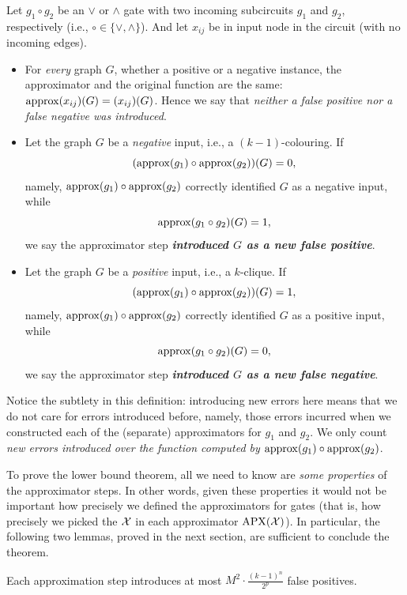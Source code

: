 \begin{definition}\label{def:new-errors}
Let $g_1\circ g_2$ be an $\lor$ or $\land$ gate with two incoming subcircuits $g_1$ and $g_2$, respectively (i.e., $\circ\in\{\lor,\land\}$). And let $x_{ij}$ be in input node in the circuit (with no incoming edges).
\begin{itemize}
\item 
For \emph{every} graph $G$, whether a positive or a  negative instance, the approximator and the original function are the same:  
${\rm approx}(x_{ij})(G)=(x_{ij})(G)$. Hence we say that \emph{neither a false positive nor a false negative was introduced}.   
 
\item 
Let the graph $G$ be a \emph{negative} input, i.e., a $(k-1)$-colouring. If 
$$({\rm approx}(g_1)\circ {\rm approx}(g_2))(G)=0,$$ namely, ${\rm approx}(g_1)\circ {\rm approx}(g_2)$ correctly identified $G$ as a negative input, 
while $${\rm approx}(g_1\circ g_2)(G)=1,$$ we say the approximator 
step \emph{\textbf{introduced $G$ as a new false positive}}. 

\item Let the graph $G$ be a \emph{positive} input, i.e., a $k$-clique. If 
$$({\rm approx}(g_1) \circ {\rm approx}(g_2))(G)=1,$$
 namely, ${\rm approx}(g_1)\circ {\rm approx}(g_2)$ correctly identified $G$ as a positive input, while 
$${\rm approx}(g_1\circ g_2)(G)=0,$$ we say the approximator step \textbf{\emph{introduced $G$ as a new false negative}}.
\end{itemize}
\end{definition}

Notice the  subtlety in this definition: introducing new errors here means that we do not care for errors introduced before, namely, those errors incurred  when we constructed each of the (separate) approximators for $g_1$ and $g_2$. We only count \emph{new errors introduced over the function computed by ${\rm approx}(g_1)\circ {\rm approx}(g_2)$}.







To prove the lower bound theorem, all we need to know are \emph{some properties} of the approximator steps. In other words, given these properties it would not be important how precisely we defined the approximators for gates (that is, how precisely we picked the $\mathcal{X}$ in each approximator $\mathrm{APX}(\mathcal{X})$).
In particular, the following two lemmas, proved in the next section, are sufficient to conclude the theorem. 
\begin{lemma}\label{lem:new-false-positives}
Each approximation step introduces at most $M^2 \cdot \frac{(k-1)^n}{2^p}$ false positives.
\end{lemma}


